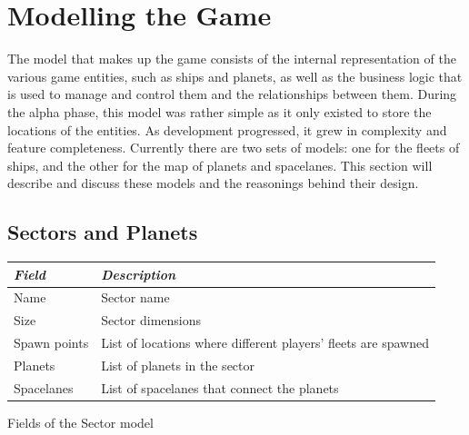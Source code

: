 \section{Modelling the Game}
\label{sec:model}

% 

The model that makes up the game consists of the internal representation of the various game entities, such as ships and planets, as well as the business logic that is used to manage and control them and the relationships between them. During the alpha phase, this model was rather simple as it only existed to store the locations of the entities. As development progressed, it grew in complexity and feature completeness. Currently there are two sets of models: one for the fleets of ships, and the other for the map of planets and spacelanes. This section will describe and discuss these models and the reasonings behind their design.

\subsection{Sectors and Planets}

\begin{margintable}
    \begin{tabular}{p{4em} p{11em}}
    \toprule
    \emph{Field} & \emph{Description} \\
    \midrule

    Name & Sector name \\
    Size & Sector dimensions \\
    Spawn points & List of locations where different players' fleets are spawned \\
    Planets & List of planets in the sector \\
    Spacelanes & List of spacelanes that connect the planets \\

    \bottomrule
    \end{tabular}
    \vspace{1em}
    \caption{Fields of the Sector model}
    \label{tab:sector-fields}
\end{margintable}

